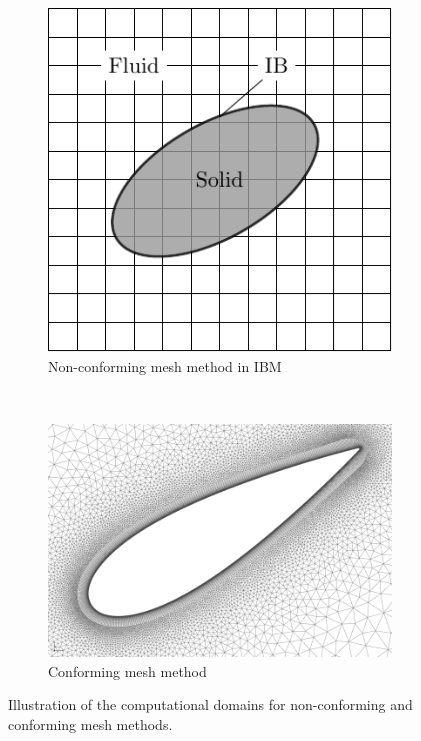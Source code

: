 \begin{figure}[t!]
	\centering
	\begin{subfigure}[t]{0.4\textwidth}
		\centering
		\includegraphics[width=1\linewidth]{images/IBM.png}
		\caption{Non-conforming mesh method in IBM}
	\end{subfigure}%
	~ 
	\begin{subfigure}[t]{0.5\textwidth}
		\centering
		\includegraphics[width=1\linewidth,height=0.8\linewidth]{images/ConformingMesh.png}
		\caption{Conforming mesh method}
	\end{subfigure}
\caption{Illustration of the computational domains for non-conforming and conforming mesh methods.}
\label{fig:FSI_lit}
\end{figure}